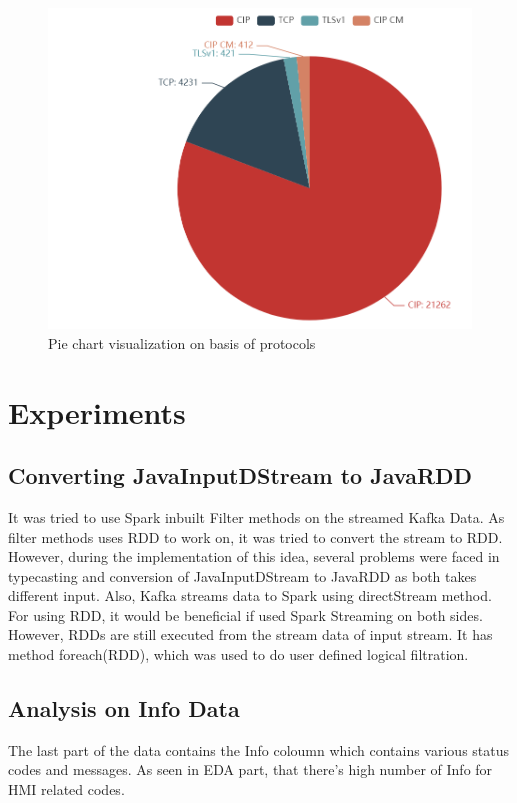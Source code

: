 \documentclass{article}
\begin{document}
\begin{figure}[h!]
\centering
\includegraphics[scale=0.55]{Dashboard.PNG}
\caption{Pie chart visualization on basis of protocols}
\label{fig:universe}
\end{figure}

\section{Experiments}

\subsection{Converting JavaInputDStream to JavaRDD}

It was tried to use Spark inbuilt Filter methods on the streamed Kafka Data. As filter methods uses RDD to work on, it was tried to convert the stream to RDD. However, during the implementation of this idea, several problems were faced in typecasting and conversion of JavaInputDStream to JavaRDD as both takes different input. Also, Kafka streams data to Spark using directStream method. For using RDD, it would be beneficial if used Spark Streaming on both sides. However, RDDs are still executed from the stream data of input stream. It has method foreach(RDD), which was used to do user defined logical filtration.

\subsection{Analysis on Info Data}

The last part of the data contains the Info coloumn which contains various status codes and messages. As seen in EDA part, that there's high number of Info for HMI related codes.
\end{document}
